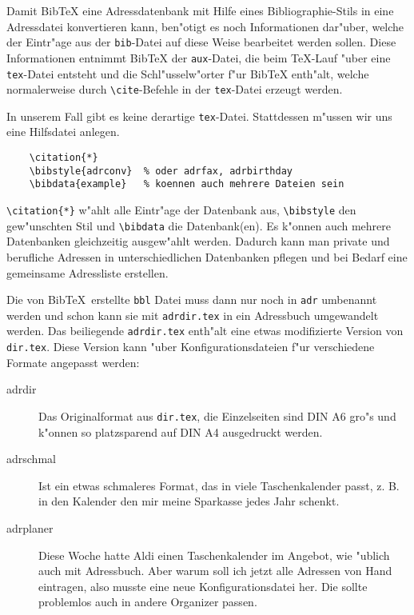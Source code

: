 \documentclass{article}
\newcommand*{\File}[1]{\texttt{#1}}
\newcommand*{\Macro}[1]{\texttt{\textbackslash #1}}
\begin{document}
Damit Bib\TeX{} eine Adressdatenbank mit Hilfe eines 
Bibliographie-Stils in eine Adressdatei konvertieren kann, ben"otigt 
es noch Informationen dar"uber, welche der Eintr"age aus der 
\File{bib}-Datei auf diese Weise bearbeitet werden sollen. 
Diese Informationen entnimmt Bib\TeX{} der \File{aux}-Datei, die beim 
\TeX-Lauf "uber eine \File{tex}-Datei entsteht und die 
Schl"usselw"orter f"ur Bib\TeX{} enth"alt, welche normalerweise durch 
\Macro{cite}-Befehle in der \File{tex}-Datei erzeugt werden.

In unserem Fall gibt es keine derartige \File{tex}-Datei.
Stattdessen m"ussen wir uns eine Hilfsdatei anlegen.
\begin{verbatim}
    \citation{*}
    \bibstyle{adrconv}  % oder adrfax, adrbirthday
    \bibdata{example}   % koennen auch mehrere Dateien sein
\end{verbatim}

\verb+\citation{*}+ w"ahlt alle Eintr"age der Datenbank aus, 
\verb+\bibstyle+ den gew"unschten Stil und \verb+\bibdata+ die 
Datenbank(en). Es k"onnen auch mehrere Datenbanken gleichzeitig 
ausgew"ahlt werden. Dadurch kann man private und berufliche Adressen 
in unterschiedlichen Datenbanken pflegen und bei Bedarf eine 
gemeinsame Adressliste erstellen.

Die von Bib\TeX\ erstellte \File{bbl} Datei muss dann nur noch in 
\File{adr} umbenannt werden und schon kann sie mit \File{adrdir.tex} 
in ein Adressbuch umgewandelt werden. Das beiliegende \File{adrdir.tex} 
enth"alt eine etwas modifizierte Version von \File{dir.tex}. Diese 
Version kann "uber Konfigurationsdateien f"ur verschiedene Formate 
angepasst werden:

\begin{description}
    \item[adrdir]  Das Originalformat aus \File{dir.tex}, die 
    Einzelseiten sind DIN A6 gro"s und k"onnen so platzsparend auf DIN 
    A4 ausgedruckt werden.

    \item[adrschmal]  Ist ein etwas schmaleres Format, das in viele 
    Taschenkalender passt, z. B. in den Kalender den mir meine 
    Sparkasse jedes Jahr schenkt.

    \item[adrplaner]  Diese Woche hatte Aldi einen Taschenkalender im 
    Angebot, wie "ublich auch mit Adressbuch. Aber warum soll ich 
    jetzt alle Adressen von Hand eintragen, also musste eine neue 
    Konfigurationsdatei her. Die sollte problemlos auch in andere 
    Organizer passen.
\end{description}
\end{document}
